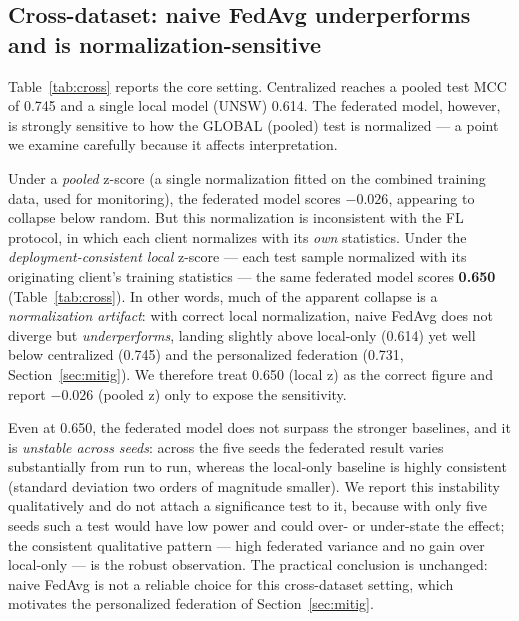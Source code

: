 \documentclass[11pt,a4paper]{article}
\begin{document}
\subsection{Cross-dataset: naive FedAvg underperforms and is normalization-sensitive}
\label{sec:cross}
Table~\ref{tab:cross} reports the core setting. Centralized reaches a pooled test
MCC of 0.745 and a single local model (UNSW) 0.614. The federated model, however,
is strongly sensitive to how the GLOBAL (pooled) test is normalized --- a point we
examine carefully because it affects interpretation.

Under a \emph{pooled} z-score (a single normalization fitted on the combined
training data, used for monitoring), the federated model scores \(-0.026\),
appearing to collapse below random. But this normalization is inconsistent with
the FL protocol, in which each client normalizes with its \emph{own} statistics.
Under the \emph{deployment-consistent local} z-score --- each test sample
normalized with its originating client's training statistics --- the same
federated model scores \textbf{0.650} (Table~\ref{tab:cross}). In other words,
much of the apparent collapse is a \emph{normalization artifact}: with correct
local normalization, naive FedAvg does not diverge but \emph{underperforms},
landing slightly above local-only (0.614) yet well below centralized (0.745) and
the personalized federation (0.731, Section~\ref{sec:mitig}). We therefore treat
0.650 (local z) as the correct figure and report \(-0.026\) (pooled z) only to
expose the sensitivity.

Even at 0.650, the federated model does not surpass the stronger baselines, and it
is \emph{unstable across seeds}: across the five seeds the federated result varies
substantially from run to run, whereas the local-only baseline is highly
consistent (standard deviation two orders of magnitude smaller). We report this
instability qualitatively and do not attach a significance test to it, because
with only five seeds such a test would have low power and could over- or
under-state the effect; the consistent qualitative pattern --- high federated
variance and no gain over local-only --- is the robust observation. The practical
conclusion is unchanged: naive FedAvg is not a reliable choice for this
cross-dataset setting, which motivates the personalized federation of
Section~\ref{sec:mitig}.
\end{document}
